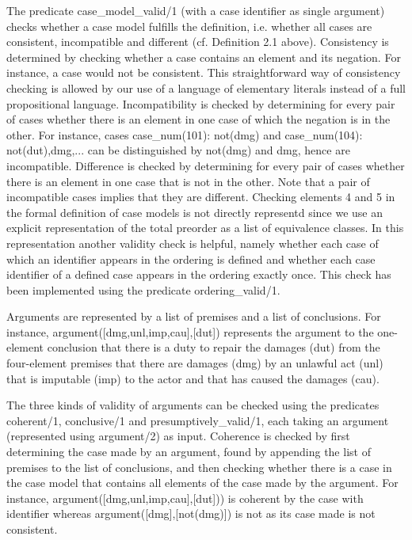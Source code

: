 \documentclass{IOS-Book-Article}
\begin{document}
The predicate {\mf case\_model\_valid/1} (with a case identifier as single argument) checks whether a case model fulfills the definition, i.e. whether all cases are consistent, incompatible and different (cf. Definition 2.1 above). Consistency is determined by checking whether a case contains an element and its negation. For instance, a case {} would not be consistent. This straightforward way of consistency checking is allowed by our use of a language of elementary literals instead of a full propositional language. Incompatibility is checked by determining for every pair of cases whether there is an element in one case of which the negation is in the other. For instance, cases 
{\mf case\_num(101): not(dmg)} and 
{\mf case\_num(104): not(dut),dmg,...} can be distinguished by {\mf not(dmg)} and {\mf dmg}, hence are incompatible. Difference is checked by determining for every pair of cases whether there is an element in one case that is not in the other. Note that a pair of incompatible cases implies that they are different. Checking elements 4 and 5 in the formal definition of case models is not directly representd since we use an explicit representation of the total preorder as a list of equivalence classes. In this representation another validity check is helpful, namely whether each case of which an identifier appears in the ordering is defined and whether each case identifier of a defined case appears in the ordering exactly once. This check has been implemented using the predicate {\mf ordering\_valid/1}.

Arguments are represented by a list of premises and a list of conclusions. For instance, {\mf argument([dmg,unl,imp,cau],[dut])} represents the argument to the one-element conclusion that there is a duty to repair the damages ({\mf dut}) from the four-element premises that there are damages ({\mf dmg}) by an unlawful act ({\mf unl}) that is imputable ({\mf imp}) to the actor and that has caused the damages ({\mf cau}).

The three kinds of validity of arguments can be checked using the predicates {\mf coherent/1}, {\mf conclusive/1} and {\mf presumptively\_valid/1}, each taking an argument (represented using {\mf argument/2}) as input. Coherence is checked by first determining the case made by an argument, found by appending the list of premises to the list of conclusions, and then checking whether there is a case in the case model that contains all elements of the case made by the argument. For instance, {\mf argument([dmg,unl,imp,cau],[dut]))} is coherent by the case with identifier {} whereas {\mf argument([dmg],[not(dmg)])} is not as its case made is not consistent.
\end{document}
